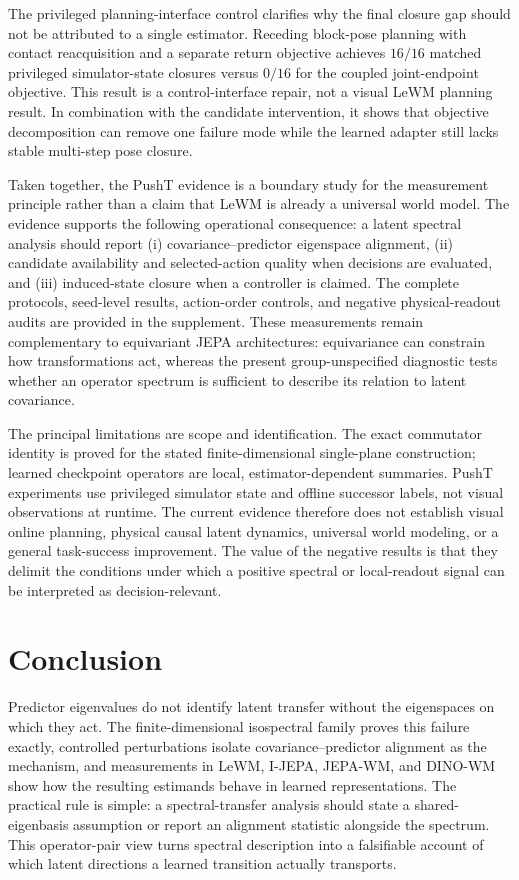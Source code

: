 \documentclass{article}
\begin{document}
The privileged planning-interface control clarifies why the final closure gap
should not be attributed to a single estimator. Receding block-pose planning
with contact reacquisition and a separate return objective achieves $16/16$
matched privileged simulator-state closures versus $0/16$ for the coupled
joint-endpoint objective. This result is a control-interface repair, not a
visual LeWM planning result. In combination with the candidate intervention,
it shows that objective decomposition can remove one failure mode while the
learned adapter still lacks stable multi-step pose closure.

Taken together, the PushT evidence is a boundary study for the measurement
principle rather than a claim that LeWM is already a universal world model.
The evidence supports the following operational consequence: a latent spectral
analysis should report (i) covariance--predictor eigenspace alignment, (ii)
candidate availability and selected-action quality when decisions are
evaluated, and (iii) induced-state closure when a controller is claimed. The
complete protocols, seed-level results, action-order controls, and negative
physical-readout audits are provided in the supplement. These measurements
remain complementary to equivariant JEPA architectures: equivariance can
constrain how transformations act, whereas the present group-unspecified
diagnostic tests whether an operator spectrum is sufficient to describe its
relation to latent covariance.

The principal limitations are scope and identification. The exact commutator
identity is proved for the stated finite-dimensional single-plane construction;
learned checkpoint operators are local, estimator-dependent summaries.
PushT experiments use privileged simulator state and offline successor labels,
not visual observations at runtime. The current evidence therefore does not
establish visual online planning, physical causal latent dynamics, universal
world modeling, or a general task-success improvement. The value of the
negative results is that they delimit the conditions under which a positive
spectral or local-readout signal can be interpreted as decision-relevant.
\section{Conclusion}

Predictor eigenvalues do not identify latent transfer without the eigenspaces on which they act. The finite-dimensional isospectral family proves this failure exactly, controlled perturbations isolate covariance--predictor alignment as the mechanism, and measurements in LeWM, I-JEPA, JEPA-WM, and DINO-WM show how the resulting estimands behave in learned representations. The practical rule is simple: a spectral-transfer analysis should state a shared-eigenbasis assumption or report an alignment statistic alongside the spectrum. This operator-pair view turns spectral description into a falsifiable account of which latent directions a learned transition actually transports.
\end{document}
